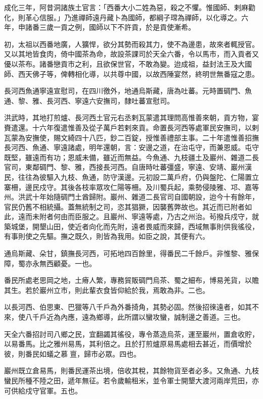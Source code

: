 \begin{pinyinscope}
成化三年，阿昔洞諸族土官言：「西番大小二姓為惡，殺之不懼。惟國師、剌麻勸化，則革心信服。」乃進禪師遠丹藏卜為國師，都綱子瑺為禪師，以化導之。六年，申諸番三歲一貢之例，國師以下不許貢，於是貢使漸希。

初，太祖以西番地廣，人獷悍，欲分其勢而殺其力，使不為邊患，故來者輒授官。又以其地皆食肉，倚中國茶為命，故設茶課司於天全六番，令以馬市，而入貢者又優以茶布。諸番戀貢市之利，且欲保世官，不敢為變。迨成祖，益封法王及大國師、西天佛子等，俾轉相化導，以共尊中國，以故西陲宴然，終明世無番寇之患。

長河西魚通寧遠宣慰司，在四川徼外，地通烏斯藏，唐為吐蕃。元時置碉門、魚通、黎、雅、長河西、寧遠六安撫司，隸吐蕃宣慰司。

洪武時，其地打煎爐、長河西土官元右丞剌瓦蒙遣其理問高惟善來朝，貢方物，宴賚遣還。十六年復遣惟善及從子萬戶若剌來貢。命置長河西等處軍民安撫司，以剌瓦蒙為安撫使，賜文綺四十八匹，鈔二百錠，授惟善禮部主事。二十年遣惟善招撫長河西、魚通、寧遠諸處，明年還朝，言：安邊之道，在治屯守，而兼恩威。屯守既堅，雖遠而有功；恩威未備，雖近而無益。今魚通、九枝疆土及巖州、雜道二長官司，東鄰碉門、黎、雅，西接長河西。自唐時吐蕃彊盛，寧遠、安靖、巖州漢民，往往為彼驅入九枝、魚通，防守漢邊。元初設二萬戶府，仍與盤陀、仁陽置立寨柵，邊民戍守。其後各枝率眾攻仁陽等柵。及川蜀兵起，乘勢侵陵雅、邛、嘉等州。洪武十年始隨碉門土酋歸附。巖州、雜道二長官司自國朝設，迨今十有餘年，官民仍舊不相統攝。蓋無統制之司，恣其猖獗，因襲舊弊故也。其近而已附者如此，遠而未附者何由而臣服之。且巖州、寧遠等處，乃古之州治。茍撥兵戍守，就築城堡，開墾山田，使近者向化而先附，遠者畏威而來歸，西域無事則供我徭役，有事則使之先驅。撫之既久，則皆為我用。如臣之說，其便有六。

通烏斯藏、朵甘，鎮撫長河西，可拓地四百餘里，得番民二千餘戶。非惟黎、雅保障，蜀亦永無西顧憂。一也。

番民所處老思岡之地，土瘠人繁，專務貿販碉門烏茶、蜀之細布，博易羌貨，以贍其生。若於巖州立市，則此輩衣食皆仰給於我，焉敢為非。二也。

以長河西、伯思東、巴獵等八千戶為外番掎角，其勢必固。然後招徠遠者，如其不來，使八千戶近為內應，遠為鄉導，此所謂以蠻攻蠻，誠制邊之善道。三也。

天全六番招討司八鄉之民，宜翻蠲其徭役，專令蒸造烏茶，運至巖州，置倉收貯，以易番馬。比之雅州易馬，其利倍之。且於打煎爐原易馬處相去甚近，而價增於彼，則番民如蟻之慕亶，歸市必眾。四也。

巖州既立倉易馬，則番民運茶出境，倍收其稅，其餘物貨至者必多。又魚通、九枝蠻民所種不陸之田，遞年無征。若令歲輸租米，並令軍士開墾大渡河兩岸荒田，亦可供給戍守官軍。五也。


\end{pinyinscope}
